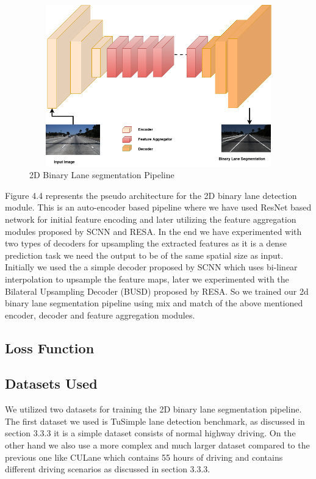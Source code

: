            \begin{figure}[h]
    \centering
    \includegraphics[width=12cm, height=7cm]{images/2dlane_pipleline.png}
    \caption{2D Binary Lane segmentation Pipeline}
    \end{figure}
        
        Figure 4.4 represents the pseudo architecture for the 2D binary lane detection module. This is an auto-encoder based pipeline where we have used ResNet \cite{DBLP:journals/corr/HeZRS15} based network for initial feature encoding and later utilizing the feature aggregation modules proposed by SCNN\cite{pan2018SCNN} and RESA\cite{DBLP:journals/corr/abs-2008-13719}. In the end we have experimented with two types of decoders for upsampling the extracted features as it is a dense prediction task we need the output to be of the same spatial size as input. Initially we used the a simple decoder proposed by SCNN\cite{pan2018SCNN} which uses bi-linear interpolation to upsample the feature maps, later we experimented with the Bilateral Upsampling Decoder (BUSD) proposed by RESA\cite{DBLP:journals/corr/abs-2008-13719}. So we trained our 2d binary lane segmentation pipeline using mix and match of the above mentioned encoder, decoder and feature aggregation modules.
        
        \subsection{Loss Function}
        
        \subsection{Datasets Used}
        We utilized two datasets for training the 2D binary lane segmentation pipeline. The first dataset we used is TuSimple lane detection benchmark\cite{Tusimple}, as discussed in section 3.3.3 it is a simple dataset consists of normal highway driving. On the other hand we also use a more complex and much larger dataset compared to the previous one like CULane\cite{pan2018SCNN} which contains 55 hours of driving and contains different driving scenarios as discussed in section 3.3.3.    
        
